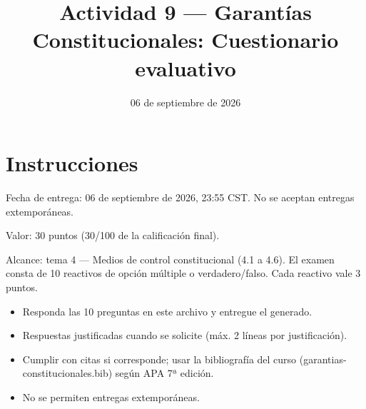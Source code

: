 \documentclass[12pt]{article}
\title{Actividad 9 — Garantías Constitucionales: Cuestionario evaluativo}
\date{06 de septiembre de 2026}
\begin{document}
\maketitle
\section*{Instrucciones}
Fecha de entrega: 06 de septiembre de 2026, 23:55 CST. No se aceptan entregas extemporáneas.

Valor: 30 puntos (30/100 de la calificación final).

Alcance: tema 4 — Medios de control constitucional (4.1 a 4.6). El examen consta de 10 reactivos de opción múltiple o verdadero/falso. Cada reactivo vale 3 puntos.

\begin{itemize}
  \item Responda las 10 preguntas en este archivo y entregue el\pdf{} generado.
  \item Respuestas justificadas cuando se solicite (máx. 2 líneas por justificación).
  \item Cumplir con citas si corresponde; usar la bibliografía del curso (garantias-constitucionales.bib) según APA 7ª edición.
  \item No se permiten entregas extemporáneas.
\end{itemize}
\end{document}
